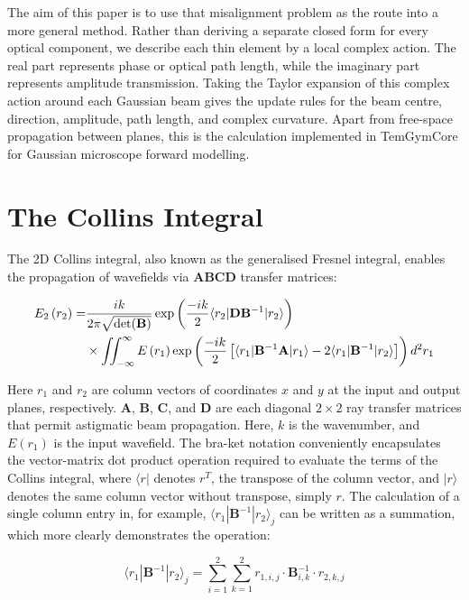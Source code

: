 \documentclass{article}
\begin{document}
The aim of this paper is to use that misalignment problem as the route into a more general method. 
Rather than deriving a separate closed form for every optical component, we describe each thin element by a local complex action. 
The real part represents phase or optical path length, while the imaginary part represents amplitude transmission. 
Taking the Taylor expansion of this complex action around each Gaussian beam gives the update rules for the beam centre, direction, amplitude, path length, and complex curvature. 
Apart from free-space propagation between planes, this is the calculation implemented in TemGymCore for Gaussian microscope forward modelling.

\section{The Collins Integral}

The 2D Collins integral, also known as the generalised Fresnel integral, enables the propagation of wavefields via $\mathbf{ABCD}$ transfer matrices:

\begin{align}
E_2\left(r_2\right) =& \frac{ik}{2\pi \sqrt{\det(\mathbf{B})}}
\exp\left(\frac{-ik}{2} \langle r_2|\mathbf{D}\mathbf{B}^{-1}|r_2\rangle\right) \notag \\
& \times \iint_{-\infty}^{\infty} E\left(r_1\right)
\exp\left(\frac{-ik}{2}\left[\langle r_1| \mathbf{B}^{-1} \mathbf{A}|r_1\rangle
- 2\langle r_1| \mathbf{B}^{-1}|r_2\rangle\right]\right) d^2 r_1
\label{eq:AlignedCollinsIntegral}
\end{align}

Here $r_1$ and $r_2$ are column vectors of coordinates $x$ and $y$ at the input and output planes, respectively. 
$\mathbf{A}$, $\mathbf{B}$, $\mathbf{C}$, and $\mathbf{D}$ are each diagonal $2 \times 2$ 
ray transfer matrices that permit astigmatic beam propagation. Here, $k$ is the wavenumber, and $E\left(r_1\right)$ is the input wavefield.   
The bra-ket notation conveniently encapsulates the vector-matrix dot product operation required to evaluate 
the terms of the Collins integral, where $\langle r |$ denotes $r^{T}$, the transpose of the column vector, and $|r\rangle$ 
denotes the same column vector without transpose, simply $r$. 
The calculation of a single column entry in, for example, $\langle r_1| \mathbf{B}^{-1}|r_2\rangle_j$ can be written as a 
summation, which more clearly demonstrates the operation:

\begin{equation}
\langle r_1 | \mathbf{B}^{-1} | r_2 \rangle_j = \sum_{i=1}^{2} \sum_{k=1}^{2} r_{1,i,j} \cdot \mathbf{B}^{-1}_{i,k} \cdot r_{2,k,j}
\label{eq:VectorMatrixProductSummation}
\end{equation}
\end{document}
